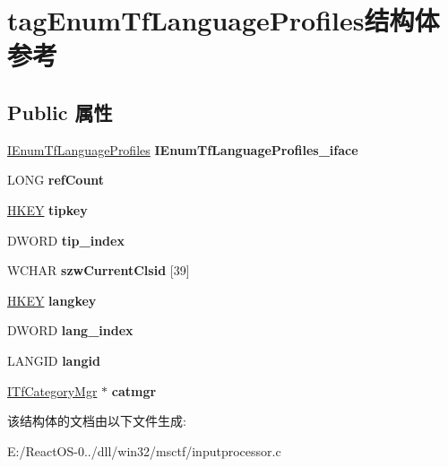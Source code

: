 \hypertarget{structtag_enum_tf_language_profiles}{}\section{tag\+Enum\+Tf\+Language\+Profiles结构体 参考}
\label{structtag_enum_tf_language_profiles}
\subsection*{Public 属性}
\begin{DoxyCompactItemize}
\item 
\mbox{\label{structtag_enum_tf_language_profiles_aac41cac071036852648d28fbb0181731}} 
\hyperlink{interface_i_enum_tf_language_profiles}{I\+Enum\+Tf\+Language\+Profiles} {\bfseries I\+Enum\+Tf\+Language\+Profiles\+\_\+iface}
\item 
\mbox{\label{structtag_enum_tf_language_profiles_a77340095559ad90a168c26ee52f4afd3}} 
L\+O\+NG {\bfseries ref\+Count}
\item 
\mbox{\label{structtag_enum_tf_language_profiles_a89aba0166160e8781c7e2c50b6467708}} 
\hyperlink{interfacevoid}{H\+K\+EY} {\bfseries tipkey}
\item 
\mbox{\label{structtag_enum_tf_language_profiles_ae041abeb8775d7161675e9d5169ba5e8}} 
D\+W\+O\+RD {\bfseries tip\+\_\+index}
\item 
\mbox{\label{structtag_enum_tf_language_profiles_a505091ee6ffc9401c7a40138ec1afebf}} 
W\+C\+H\+AR {\bfseries szw\+Current\+Clsid} \mbox{[}39\mbox{]}
\item 
\mbox{\label{structtag_enum_tf_language_profiles_aa62d3fffc0cc0ea885b643075e317742}} 
\hyperlink{interfacevoid}{H\+K\+EY} {\bfseries langkey}
\item 
\mbox{\label{structtag_enum_tf_language_profiles_ab5dc8f02cd1ebe674759c2ab0057ae52}} 
D\+W\+O\+RD {\bfseries lang\+\_\+index}
\item 
\mbox{\label{structtag_enum_tf_language_profiles_aed420a4ac3f1070bfe19229853821304}} 
L\+A\+N\+G\+ID {\bfseries langid}
\item 
\mbox{\label{structtag_enum_tf_language_profiles_a413ff9bc7918fe0d00d029ab6c253762}} 
\hyperlink{interface_i_tf_category_mgr}{I\+Tf\+Category\+Mgr} $\ast$ {\bfseries catmgr}
\end{DoxyCompactItemize}


该结构体的文档由以下文件生成\+:\begin{DoxyCompactItemize}
\item 
E\+:/\+React\+O\+S-\/0../dll/win32/msctf/inputprocessor.\+c\end{DoxyCompactItemize}
